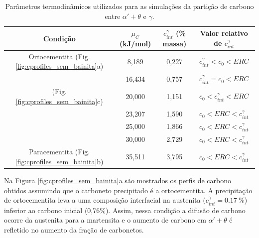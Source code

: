 \begin{table}
  \centering
  \caption{Parâmetros termodinâmicos utilizados para as simulações da partição de carbono entre $\alpha' + \theta$ e $\gamma$.}
  \begin{tabular}{cccc}
    \hline
    Condição & $\mu_C$ (kJ/mol) & $c^\gamma_{int}$ (\% massa) & Valor relativo de $c^\gamma_{int}$\\
    \hline
    Ortocementita (Fig. \ref{fig:cprofiles_sem_bainita}a) & 8,189 & 0,227 & $c^\gamma_{int} < c_0 < ERC$ \\
    & 16,434 & 0,757 & $c^\gamma_{int} = c_0 < ERC$ \\
    (Fig. \ref{fig:cprofiles_sem_bainita}c) & 20,000 & 1,151 & $c_0 < c^\gamma_{int} < ERC$ \\
    & 23,207 & 1,590 & $c_0 < ERC < c^\gamma_{int}$ \\
    & 25,000 & 1,866 & $c_0 < ERC < c^\gamma_{int}$ \\
    & 30,000 & 2,729 & $c_0 < ERC < c^\gamma_{int}$ \\
    Paracementita (Fig. \ref{fig:cprofiles_sem_bainita}b) & 35,511 & 3,795 & $c_0 < ERC < c^\gamma_{int}$ \\
    \hline
  \end{tabular}
  \label{tab:cpartition_CCEtheta}
\end{table}

Na Figura \ref{fig:cprofiles_sem_bainita}a são mostrados os perfis de carbono obtidos assumindo que o carboneto precipitado é a ortocementita. A precipitação de ortocementita leva a uma composição interfacial na austenita ($c^\gamma_{int} = \SI{0.17}{\%}$) inferior ao carbono inicial (0,76\%). Assim, nessa condição a difusão de carbono ocorre da austenita para a martensita e o aumento de carbono em $\alpha' + \theta$ é refletido no aumento da fração de carbonetos.

